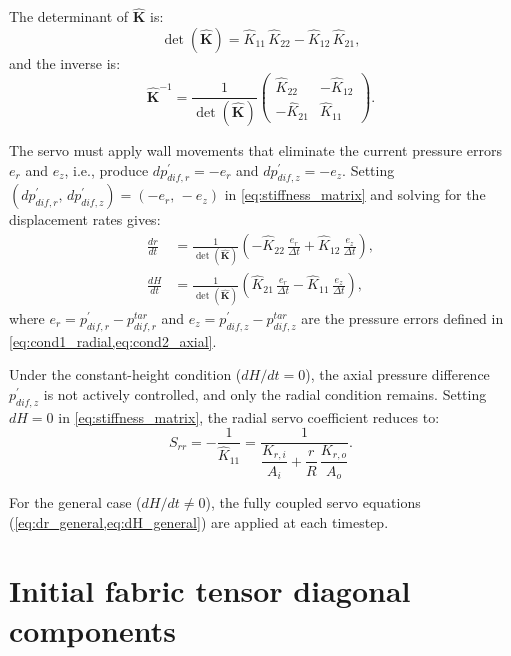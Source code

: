 \documentclass[a4paper,fleqn]{cas-sc}
\begin{document}
The determinant of $\hat{\mathbf{K}}$ is:
\begin{equation}
\det(\hat{\mathbf{K}}) = \hat{K}_{11}\,\hat{K}_{22} - \hat{K}_{12}\,\hat{K}_{21},
\label{eq:det_K}
\end{equation}
and the inverse is:
\begin{equation}
\hat{\mathbf{K}}^{-1}
=
\frac{1}{\det(\hat{\mathbf{K}})}
\begin{pmatrix} \hat{K}_{22} & -\hat{K}_{12} \\[6pt] -\hat{K}_{21} & \hat{K}_{11} \end{pmatrix}.
\label{eq:stiffness_matrix_inv}
\end{equation}

The servo must apply wall movements that eliminate the current pressure errors $e_r$ and $e_z$, i.e., produce $dp_{dif,r}^{\prime}=-e_r$ and $dp_{dif,z}^{\prime}=-e_z$. Setting $(dp_{dif,r}^{\prime},\,dp_{dif,z}^{\prime})=(-e_r,\,-e_z)$ in \cref{eq:stiffness_matrix} and solving for the displacement rates gives:
\begin{align}
\frac{dr}{dt} &= \frac{1}{\det(\hat{\mathbf{K}})}\!\left(-\hat{K}_{22}\,\frac{e_r}{\Delta t} + \hat{K}_{12}\,\frac{e_z}{\Delta t}\right), \label{eq:dr_general}\\[6pt]
\frac{dH}{dt} &= \frac{1}{\det(\hat{\mathbf{K}})}\!\left(\hat{K}_{21}\,\frac{e_r}{\Delta t} - \hat{K}_{11}\,\frac{e_z}{\Delta t}\right), \label{eq:dH_general}
\end{align}
where $e_r=p_{dif,r}^{\prime}-p_{dif,r}^{tar}$ and $e_z=p_{dif,z}^{\prime}-p_{dif,z}^{tar}$ are the pressure errors defined in \cref{eq:cond1_radial,eq:cond2_axial}.

Under the constant-height condition ($dH/dt=0$), the axial pressure difference $p_{dif,z}^{\prime}$ is not actively controlled, and only the radial condition remains. Setting $dH=0$ in \cref{eq:stiffness_matrix}, the radial servo coefficient reduces to:
\begin{equation}
S_{rr} = -\frac{1}{\hat{K}_{11}} = \frac{1}{\dfrac{K_{r,i}}{A_i}+\dfrac{r}{R}\,\dfrac{K_{r,o}}{A_o}}.
\label{eq:Srr_constantH}
\end{equation}

For the general case ($dH/dt\neq 0$), the fully coupled servo equations (\cref{eq:dr_general,eq:dH_general}) are applied at each timestep.

\section{Initial fabric tensor diagonal components}
\label{sec:appendix_fabric}
\end{document}
